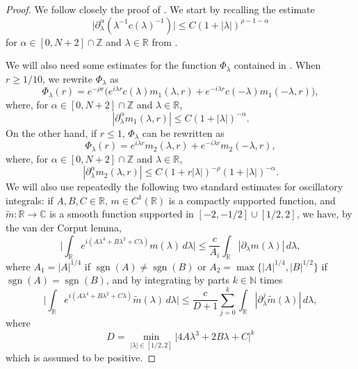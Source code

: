 \documentclass[10pt,leqno]{amsart}
\newcommand{\huom}[2][1=]{\todo[linecolor=red,backgroundcolor=red!10,bordercolor=red,#1]{#2}}
\numberwithin{equation}{section}
\newcommand{\field}[1]{\mathbb{#1}}
\newcommand{\N}{\field{N}}          		%
\newcommand{\Z}{\field{Z}}          		%
\newcommand{\R}{\field{R}}          		%
\DeclareMathOperator\sgn{sgn}
\begin{document}
\begin{proof}
We follow closely the proof of \cite[Lemma 3.2]{IS2009}. 
We start by recalling the estimate 
\begin{equation}
\label{cest}
\big|\partial_{\lambda}^{\alpha}(\lambda^{-1} c(\lambda)^{-1})\big| \leq C (1+|\lambda|)^{\rho-1 - \alpha}
\end{equation}
for $\alpha\in [0,N+2]\cap \Z$ and $\lambda\in\R$ from \cite[Prop. A1]{I-JFA2000}.

We will also need some estimates for the function $\Phi_\lambda$ contained in \cite[Prop. A2]{I-JFA2000}. When $r\geq 1/10$, we rewrite $\Phi_\lambda$ as
\begin{equation}
\label{phismall}
\Phi_\lambda (r)=e^{-\rho r} \big(e^{i\lambda r} c(\lambda) m_1 (\lambda ,r) +e^{-i\lambda r} c(-\lambda ) m_1 (-\lambda ,r)\big),
\end{equation}
where, for $\alpha \in [0,N+2] \cap \Z$ and $\lambda \in \R$, 
\begin{equation}
\label{m1est}
|\partial_\lambda^\alpha m_1 (\lambda ,r)| \leq C (1+|\lambda|)^{-\alpha}.
\end{equation}
On the other hand, if $r\leq 1$, $\Phi_\lambda$ can be rewritten as
\begin{equation}
\label{philarge}
\Phi_\lambda (r)= e^{i\lambda r} m_2 (\lambda ,r)+ e^{-i\lambda r} m_2 (-\lambda ,r),
\end{equation}
where, for $\alpha \in [0,N+2] \cap \Z$ and $\lambda \in \R$,
\begin{equation}
\label{m2est}
|\partial_\lambda^\alpha m_2 (\lambda ,r)| \leq C (1+r|\lambda|)^{-\rho} (1+|\lambda|)^{ - \alpha}.
\end{equation}
We will also use repeatedly the following two standard  estimates for oscillatory integrals: if $A,B,C \in \R$, $m\in C^1 (\R)$ is a compactly supported function, and $\tilde{m} : \R \rightarrow \mathbb{C}$ is a smooth function supported in $[-2,-1/2] \cup [1/2 ,2]$, we have, by the van der Corput lemma,
\begin{equation}
\label{VdC1}
\Big|\int_{\R} e^{i(A\lambda^4 +B\lambda^2 +C\lambda)}m (\lambda)\, d\lambda \Big|\leq \frac{c}{ A_i} \int_{\R} |\partial_\lambda m (\lambda)|\, d\lambda,
\end{equation}
where $A_1= |A|^{1/4}$ if $\sgn (A) \neq \sgn(B)$ or $A_2 = \max \{|A|^{1/4},|B|^{1/2}\}$ if $\sgn(A) = \sgn(B)$, and by integrating by parts $k\in \N$ times
\begin{equation}
\label{VdC2}
\Big|\int_{\R} e^{i(A\lambda^4 +B\lambda^2 +C\lambda)}\tilde{m} (\lambda)\, d\lambda \Big| 
\leq 
\frac{c}{D+1}\sum_{j=0}^k \int_{\R} |\partial_\lambda^j \tilde{m} (\lambda)|\, d\lambda,
\end{equation}
where 
\[
D=\min_{|\lambda| \in [1/2 ,2]}\big|4A\lambda^3 +2B\lambda +C\big|^k
\]
which is assumed to be positive.


\end{proof}
\end{document}
